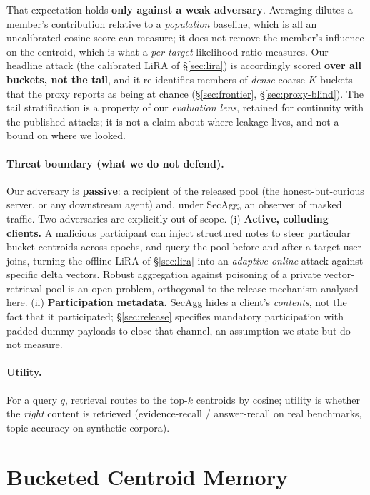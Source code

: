 \documentclass[pdflatex,sn-mathphys-num,12pt]{sn-jnl}
\theoremstyle{thmstyleone}%
\theoremstyle{thmstyletwo}%
\theoremstyle{thmstylethree}%
\newcommand{\secref}[1]{\S\ref{#1}}
\begin{document}
That expectation holds \textbf{only against a weak adversary}. Averaging dilutes a member's
contribution relative to a \emph{population} baseline, which is all an uncalibrated cosine score
can measure; it does not remove the member's influence on the centroid, which is what a
\emph{per-target} likelihood ratio measures. Our headline attack (the calibrated LiRA of
\secref{sec:lira}) is accordingly scored \textbf{over all buckets, not the tail}, and it
re-identifies members of \emph{dense} coarse-$K$ buckets that the proxy reports as being at
chance (\secref{sec:frontier}, \secref{sec:proxy-blind}). The tail stratification is a property
of our \emph{evaluation lens}, retained for continuity with the published attacks; it is not a
claim about where leakage lives, and not a bound on where we looked.

\paragraph{Threat boundary (what we do not defend).} Our adversary is
\textbf{passive}: a recipient of the released pool (the honest-but-curious
server, or any downstream agent) and, under SecAgg, an observer of masked
traffic. Two adversaries are explicitly out of scope. (i) \textbf{Active,
colluding clients.} A malicious participant can inject structured notes to steer
particular bucket centroids across epochs, and query the pool before and after a
target user joins, turning the offline LiRA of \secref{sec:lira} into an
\emph{adaptive online} attack against specific delta vectors. Robust aggregation
against poisoning of a private vector-retrieval pool is an open problem,
orthogonal to the release mechanism analysed here. (ii) \textbf{Participation
metadata.} SecAgg hides a client's \emph{contents}, not the fact that it
participated; \secref{sec:release} specifies mandatory participation with padded
dummy payloads to close that channel, an assumption we state but do not measure.

\paragraph{Utility.} For a query $q$, retrieval routes to the top-$k$ centroids by
cosine; utility is whether the \emph{right} content is retrieved
(evidence-recall / answer-recall on real benchmarks, topic-accuracy on synthetic
corpora).

\section{Bucketed Centroid Memory}\label{sec:centroid}
\end{document}
